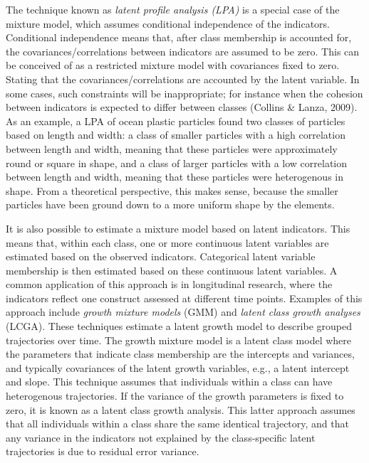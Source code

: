 \documentclass[
  ,man,floatsintext]{apa6}
\begin{document}
The technique known as \emph{latent profile analysis (LPA)} is a special case
of the mixture model, which assumes conditional independence of the
indicators. Conditional independence means that, after class membership
is accounted for, the covariances/correlations between indicators are
assumed to be zero. This can be conceived of as a restricted mixture
model with covariances fixed to zero. Stating that the covariances/correlations are accounted by the latent variable. In some cases, such constraints
will be inappropriate; for instance when the cohesion between indicators
is expected to differ between classes (Collins \& Lanza, 2009). As an example, a LPA of ocean
plastic particles found two classes of particles based on length and
width: a class of smaller particles with a high correlation between
length and width, meaning that these particles were approximately round
or square in shape, and a class of larger particles with a low
correlation between length and width, meaning that these particles were
heterogenous in shape. From a theoretical perspective, this makes sense,
because the smaller particles have been ground down to a more uniform
shape by the elements.

It is also possible to estimate a mixture model based on latent
indicators. This means that, within each class, one or more continuous
latent variables are estimated based on the observed indicators.
Categorical latent variable membership is then estimated based on these
continuous latent variables. A common application of this approach is in
longitudinal research, where the indicators reflect one construct
assessed at different time points. Examples of this approach include
\emph{growth mixture models} (GMM) and \emph{latent class growth analyses} (LCGA).
These techniques estimate a latent growth model to describe grouped
trajectories over time. The growth mixture model is a latent class model
where the parameters that indicate class membership are the intercepts
and variances, and typically covariances of the latent growth variables,
e.g., a latent intercept and slope. This technique assumes that
individuals within a class can have heterogenous trajectories. If the
variance of the growth parameters is fixed to zero, it is known as a
latent class growth analysis. This latter approach assumes that all
individuals within a class share the same identical trajectory, and that
any variance in the indicators not explained by the class-specific
latent trajectories is due to residual error variance.
\end{document}
